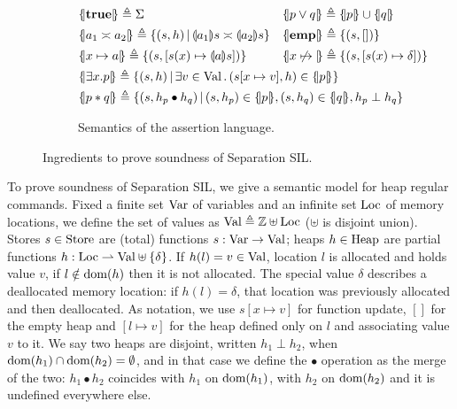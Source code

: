 \begin{figure}[t]
\begin{subfigure}[t]{\linewidth}
\begin{align*}
			 & \asldenot{\true} \eqdef \Sigma                                                                                                              &  & \asldenot{p \lor q} \eqdef \asldenot{p} \cup \asldenot{q}     \\
			 & \asldenot{a_1 \asymp a_2} \eqdef \{ (s, h) \svert \edenot{a_1} s \asymp \edenot{a_2} s \}                                                   &  & \asldenot{\emp} \eqdef \{ (s, []) \}                          \\
			 & \asldenot{x \mapsto a} \eqdef \{ (s, [s(x) \mapsto \edenot{a} s]) \}                                                                        &  & \asldenot{x \dealloc} \eqdef \{ (s, [s(x) \mapsto \delta]) \} \\
			 & \rlap{$\asldenot{\exists x. p} \eqdef \{ (s, h) \svert \exists v \in \Val \sdot (s[x \mapsto v], h) \in \asldenot{p} \}$}                                                                                      \\
			 & \rlap{$\asldenot{p \andsep q} \eqdef \{ (s, h_p \bullet h_q) \svert (s, h_p) \in \asldenot{p}, (s,h_q) \in \asldenot{q}, h_p \perp h_q \}$}
		\end{align*}
		\caption{Semantics of the assertion language.}
		\label{fig:sil:ssil-model-assertions}
	\end{subfigure}
	\caption{Ingredients to prove soundness of Separation SIL.}
\end{figure}

To prove soundness of Separation SIL, we give a semantic model for heap regular commands.
Fixed a finite set $\text{Var}$ of variables and an infinite set $\text{Loc}$ of memory locations, we define the set of values as $\text{Val} \triangleq \mathbb{Z} \uplus \text{Loc}$ ($\uplus$ is disjoint union).
Stores $s \in \text{Store}$ are (total) functions $s: \text{Var} \rightarrow \text{Val}$; heaps $h \in \text{Heap}$ are partial functions $h: \text{Loc} \rightharpoonup \text{Val} \uplus \{ \delta \}$. If $h(l) = v \in \text{Val}$, location $l$ is allocated and holds value $v$, if $l \notin \text{dom}(h)$ then it is not allocated. The special value $\delta$ describes a deallocated memory location: if $h(l) = \delta$, that location was previously allocated and then deallocated.
As notation, we use $s[x \mapsto v]$ for function update, $[]$ for the empty heap and $[l \mapsto v]$ for the heap defined only on $l$ and associating value $v$ to it.
We say two heaps are disjoint, written $h_1 \perp h_2$, when $\text{dom}(h_1) \cap \text{dom}(h_2) = \emptyset$, and in that case we define the $\bullet$ operation as the merge of the two: $h_1 \bullet h_2$ coincides with $h_1$ on $\text{dom}(h_1)$, with $h_2$ on $\text{dom}(h_2)$ and it is undefined everywhere else.

